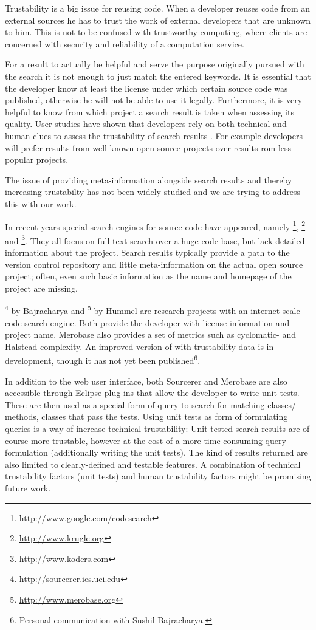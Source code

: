 Trustability is a big issue for reusing code. When a developer reuses code from an external sources he has to trust the work of external developers that are unknown to him. This is not to be confused with trustworthy computing, where clients are concerned with security and reliability of a computation service.

For a result to actually be helpful and serve the purpose originally pursued with the search it is not enough to just match the entered keywords.
It is essential that the developer know at least the license under which certain source code was published, otherwise he will not be able to use it legally. Furthermore, it is very helpful to know from which project a search result is taken when assessing its quality.
User studies have shown that developers rely on both technical and human clues to assess the trustability of search results \cite{Gall09a}. For example developers will prefer results from well-known open source projects over results rom less popular projects.

The issue of providing meta-information alongside search results and thereby increasing trustabilty has not been widely studied and we are trying to address this with our work.

In recent years special search engines for source code have appeared, namely  \textsc{\gcs}\footnote{\url{http://www.google.com/codesearch}}, \textsc{\krugle}\footnote{\url{http://www.krugle.org}} and  \textsc{\koders}\footnote{\url{http://www.koders.com}}. They all focus on full-text search over a huge code base, but lack detailed information about the project. Search results typically provide a path to the version control repository and little meta-information on the actual open source project; often, even such basic information as the name and homepage of the project are missing.

\textsc{\sourcerer}\footnote{\url{http://sourcerer.ics.uci.edu}} by Bajracharya \etal \cite{Bajr06a} and \textsc{\merobase}\footnote{\url{http://www.merobase.org}} by Hummel \etal \cite{Humm08a} are research projects with an internet-scale code search-engine. Both provide the developer with license information and project name. Merobase also provides a set of metrics such as cyclomatic- and Halstead complexity.  An improved version of \sourcerer with trustability data is in development, though it has not yet been published\footnote{Personal communication with Sushil Bajracharya.}. 

In addition to the web user interface, both Sourcerer and Merobase are also accessible through Eclipse plug-ins that allow the developer to write unit tests. These are then used as a special form of query to search for matching classes/ methods, \ie classes that pass the tests\cite{Humm08a}. Using unit tests as form of formulating queries is a way of increase technical trustability: Unit-tested search results are of course more trustable, however at the cost of a more time consuming query formulation (\ie additionally writing the unit tests). The kind of results returned are also limited to clearly-defined and testable features.  A combination of technical trustability factors (\eg unit tests) and human trustability factors might be promising future work.

